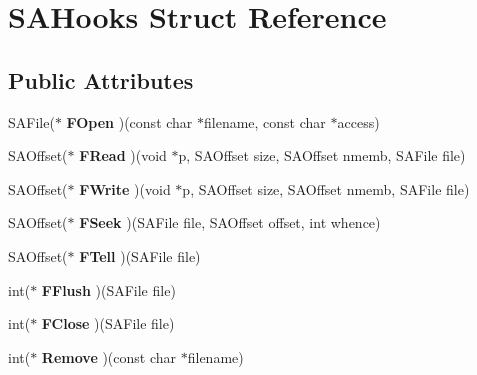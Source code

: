 \hypertarget{structSAHooks}{\section{S\-A\-Hooks Struct Reference}
\label{structSAHooks}
}
\subsection*{Public Attributes}
\begin{DoxyCompactItemize}
\item 
\hypertarget{structSAHooks_a1aa33c7b11f02fc4d9f9071b0e7bfdba}{S\-A\-File($\ast$ {\bfseries F\-Open} )(const char $\ast$filename, const char $\ast$access)}\label{structSAHooks_a1aa33c7b11f02fc4d9f9071b0e7bfdba}

\item 
\hypertarget{structSAHooks_a9e70e015186a31878b716bf289ceb0d2}{S\-A\-Offset($\ast$ {\bfseries F\-Read} )(void $\ast$p, S\-A\-Offset size, S\-A\-Offset nmemb, S\-A\-File file)}\label{structSAHooks_a9e70e015186a31878b716bf289ceb0d2}

\item 
\hypertarget{structSAHooks_aad50bf7d1692be7c0e279ec8a738ec20}{S\-A\-Offset($\ast$ {\bfseries F\-Write} )(void $\ast$p, S\-A\-Offset size, S\-A\-Offset nmemb, S\-A\-File file)}\label{structSAHooks_aad50bf7d1692be7c0e279ec8a738ec20}

\item 
\hypertarget{structSAHooks_ad2597e0bc8352eb21304f02f1d1cd744}{S\-A\-Offset($\ast$ {\bfseries F\-Seek} )(S\-A\-File file, S\-A\-Offset offset, int whence)}\label{structSAHooks_ad2597e0bc8352eb21304f02f1d1cd744}

\item 
\hypertarget{structSAHooks_acd9a5a7e3f6700a2bf1ba5ad58a4e23c}{S\-A\-Offset($\ast$ {\bfseries F\-Tell} )(S\-A\-File file)}\label{structSAHooks_acd9a5a7e3f6700a2bf1ba5ad58a4e23c}

\item 
\hypertarget{structSAHooks_ae5143f7d9c34ec679dc18c2e63391aac}{int($\ast$ {\bfseries F\-Flush} )(S\-A\-File file)}\label{structSAHooks_ae5143f7d9c34ec679dc18c2e63391aac}

\item 
\hypertarget{structSAHooks_a4f6ea8b9b955bd07e57fdede643ce6a4}{int($\ast$ {\bfseries F\-Close} )(S\-A\-File file)}\label{structSAHooks_a4f6ea8b9b955bd07e57fdede643ce6a4}

\item 
\hypertarget{structSAHooks_a7d13713d29fdb290f863454d167fe3ef}{int($\ast$ {\bfseries Remove} )(const char $\ast$filename)}\label{structSAHooks_a7d13713d29fdb290f863454d167fe3ef}


\end{DoxyCompactItemize}
